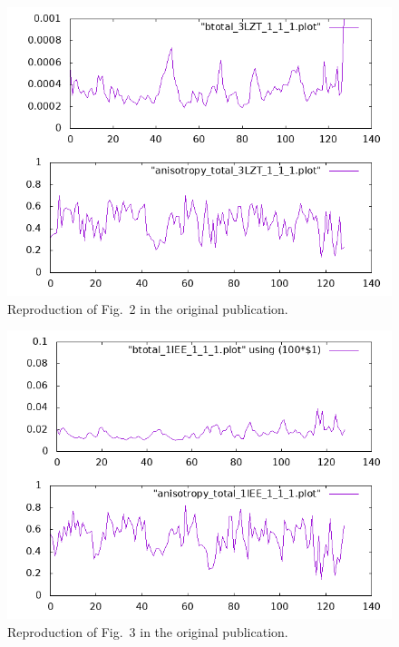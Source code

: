 \begin{figure}
\includegraphics[width=.9\textwidth]{../reproduction/fig2.png}
\caption{Reproduction of Fig.~2 in the original publication.}
\label{fig2}
\end{figure}

\begin{figure}
\includegraphics[width=.9\textwidth]{../reproduction/fig3.png}
\caption{Reproduction of Fig.~3 in the original publication.}
\label{fig3}
\end{figure}

